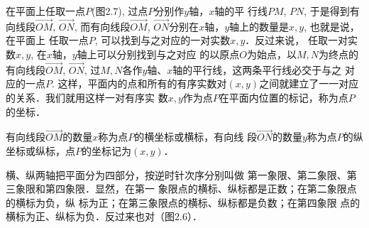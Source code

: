 \begin{figure}[htp]
\centering
\begin{minipage}[t]{0.48\textwidth}
\centering
{}
\caption{}
\end{minipage}
\begin{minipage}[t]{0.48\textwidth}
\centering
{}
\caption{}
\end{minipage}
\end{figure}



在平面上任取一点$P$(图2.7), 过点$P$分别作$y$轴，$x$轴的平
行线$PM$, $PN$, 于是得到有向线段$\Vec{OM}$, $\Vec{ON}$, 而有向线段$\Vec{OM}$, $\Vec{ON}$分别在$x$轴，$y$轴上的数量是$x,y$, 也就是说，在平面上
任取一点$P$, 可以找到与之对应的一对实数$x,y$．反过来说，
任取一对实数$x,y$, 在$x$轴，$y$轴上可以分别找到与之对应
的以原点$O$为始点，以$M,N$为终点的有向线段$\Vec{OM}$, $\Vec{ON}$,
过$M,N$各作$y$轴、$x$轴的平行线，这两条平行线必交于与之
对应的一点$P$. 这样，平面内的点和所有的有序实数对$(x,y)$之间就建立了一一对应的关系．我们就用这样一对有序实
数$x,y$作为点$P$在平面内位置的标记，称为点$P$的坐标．

有向线段$\Vec{OM}$的数量$x$称为点$P$的横坐标或横标，有向线
段$\Vec{ON}$的数量$y$称为点$P$的纵坐标或纵标，点$P$的坐标记为$(x,
y)$．

横、纵两轴把平面分为四部分，按逆时针次序分别叫做
第一象限、第二象限、第三象限和第四象限．显然，在第一
象限点的横标、纵标都是正数；在第二象限点的横标为负，纵
标为正；在第三象限点的横标、纵标都是负数；在第四象限
点的横标为正、纵标为负．反过来也对（图2.6）．

